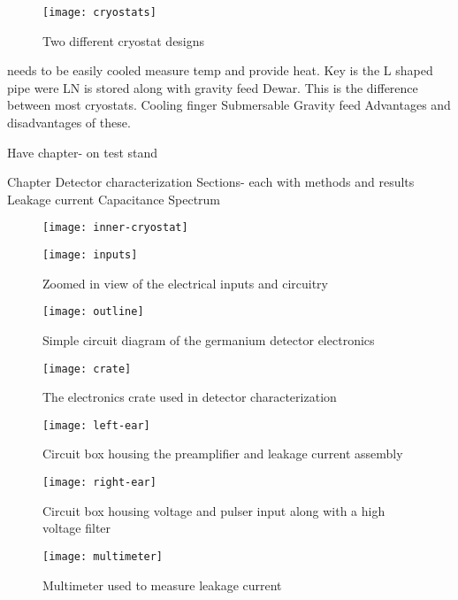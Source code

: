 \begin{figure}[htpb]
\centering
\texttt{[image: cryostats]}
\caption{Two different cryostat designs}
\label{fig:cryostats}
\end{figure}

needs to be easily cooled
measure temp and provide heat.
Key is the L shaped pipe were LN is stored along with gravity feed Dewar. This is the difference between most cryostats.
Cooling finger
Submersable 
Gravity feed
Advantages and disadvantages of these.

Have chapter- on test stand

Chapter Detector characterization
Sections- each with methods and results
Leakage current
Capacitance
Spectrum


\begin{figure}[htpb]
\centering
\texttt{[image: inner-cryostat]}
\caption{}
\label{fig:inner-cryostat}
\end{figure}

\begin{figure}[htpb]
\centering
\texttt{[image: inputs]}
\caption{Zoomed in view of the electrical inputs and circuitry}
\label{fig:inputs}
\end{figure}

\begin{figure}[htpb]
\centering
\texttt{[image: outline]}
\caption{Simple circuit diagram of the germanium detector electronics}
\label{fig:outline}
\end{figure}

\begin{figure}[htpb]
\centering
\texttt{[image: crate]}
\caption{The electronics crate used in detector characterization}
\label{fig:crate}
\end{figure}

\begin{figure}[htpb]
\centering
\texttt{[image: left-ear]}
\caption{Circuit box housing the preamplifier and leakage current assembly}
\label{fig:left-ear}
\end{figure}

\begin{figure}[htpb]
\centering
\texttt{[image: right-ear]}
\caption{Circuit box housing voltage and pulser input along with a high voltage filter}
\label{fig:right-ear}
\end{figure}

\begin{figure}[htpb]
\centering
\texttt{[image: multimeter]}
\caption{Multimeter used to measure leakage current}
\label{fig:multimeter}
\end{figure}

